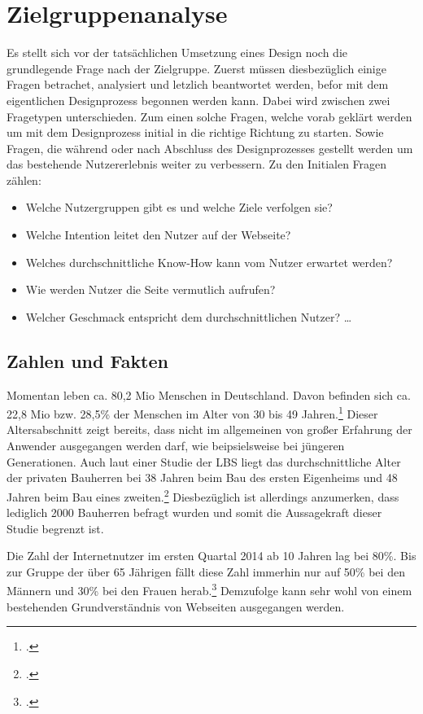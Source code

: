 \section{Zielgruppenanalyse}
Es stellt sich vor der tatsächlichen Umsetzung eines Design noch die grundlegende Frage nach der Zielgruppe. Zuerst müssen diesbezüglich einige Fragen betrachet, analysiert und letzlich beantwortet werden, befor mit dem eigentlichen Designprozess begonnen werden kann. Dabei wird zwischen zwei Fragetypen unterschieden. Zum einen solche Fragen, welche vorab geklärt werden um mit dem Designprozess initial in die richtige Richtung zu starten. Sowie Fragen, die während oder nach Abschluss des Designprozesses gestellt werden um das bestehende Nutzererlebnis weiter zu verbessern.
Zu den Initialen Fragen zählen: 
\begin{itemize}
	\item Welche Nutzergruppen gibt es und welche Ziele verfolgen sie?
	\item Welche Intention leitet den Nutzer auf der Webseite?
	\item Welches durchschnittliche Know-How kann vom Nutzer erwartet werden? 
	\item Wie werden Nutzer die Seite vermutlich aufrufen? 
	\item Welcher Geschmack entspricht dem durchschnittlichen Nutzer? \ldots
\end{itemize}
\subsection{Zahlen und Fakten}
Momentan leben ca. 80,2 Mio Menschen in Deutschland. Davon befinden sich ca. 22,8 Mio bzw. 28,5\% der Menschen im Alter von 30 bis 49 Jahren.\footcite[vgl.][]{zensus2011:alter} Dieser Altersabschnitt zeigt bereits, dass nicht im allgemeinen von großer Erfahrung der Anwender ausgegangen werden darf, wie beipsielsweise bei jüngeren Generationen. Auch laut einer Studie der LBS liegt das durchschnittliche Alter der privaten Bauherren bei 38 Jahren beim Bau des ersten Eigenheims und 48 Jahren beim Bau eines zweiten.\footcite[vgl.][]{lbs} Diesbezüglich ist allerdings anzumerken, dass lediglich 2000 Bauherren befragt wurden und somit die Aussagekraft dieser Studie begrenzt ist.

Die Zahl der Internetnutzer im ersten Quartal 2014 ab 10 Jahren lag bei 80\%. Bis zur Gruppe der über 65 Jährigen fällt diese Zahl immerhin nur auf 50\% bei den Männern und 30\% bei den Frauen herab.\footcite[vgl.][]{stabu} Demzufolge kann sehr wohl von einem bestehenden Grundverständnis von Webseiten ausgegangen werden. 

